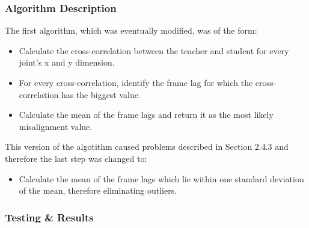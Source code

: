 \documentclass[a4paper]{article}
\begin{document}
\subsubsection{Algorithm Description}
\noindent
The first algorithm, which was eventually modified, was of the form:
\begin{itemize}
\setlength{\itemsep}{1pt}
\setlength{\parskip}{0pt}
\setlength{\parsep}{0pt}
	\item Calculate the cross-correlation between the teacher and student for every joint's x and y dimension.
	\item For every cross-correlation, identify the frame lag for which the cross-correlation has the biggest value.
	\item Calculate the mean of the frame lags and return it as the most likely misalignment value.
\end{itemize}
This version of the algotithm caused problems described in Section 2.4.3 and therefore the last step was changed to:
\begin{itemize}
\setlength{\itemsep}{1pt}
\setlength{\parskip}{0pt}
\setlength{\parsep}{0pt}
	\item Calculate the mean of the frame lags which lie within one standard deviation of the mean, therefore eliminating outliers.
\end{itemize}

\subsubsection{Testing \& Results}
\end{document}
